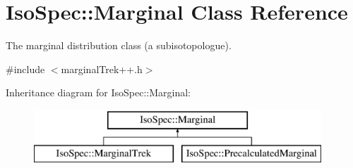 \hypertarget{class_iso_spec_1_1_marginal}{}\section{Iso\+Spec\+:\+:Marginal Class Reference}
\label{class_iso_spec_1_1_marginal}


The marginal distribution class (a subisotopologue).  




{\ttfamily \#include $<$marginal\+Trek++.\+h$>$}

Inheritance diagram for Iso\+Spec\+:\+:Marginal\+:\begin{figure}[H]
\begin{center}
\leavevmode
\includegraphics[height=2.000000cm]{class_iso_spec_1_1_marginal}
\end{center}
\end{figure}
